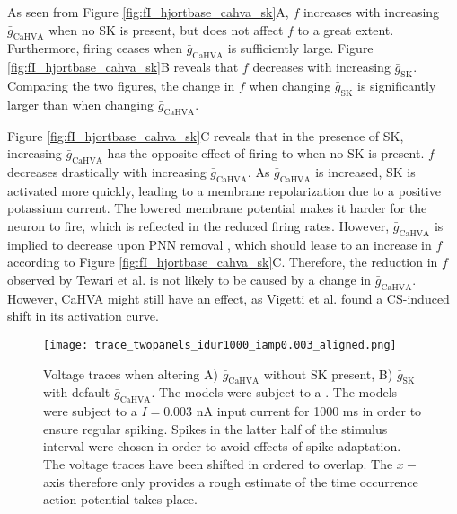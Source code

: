 \documentclass[times, twoside]{zHenriquesLab-StyleBioRxiv}
\begin{document}
As seen from Figure \ref{fig:fI_hjortbase_cahva_sk}A, $f$ increases with increasing $\bar{g}_\text{CaHVA}$ when no SK is present, but does not affect $f$ to a great extent. Furthermore, firing ceases when $\bar{g}_\text{CaHVA}$ is sufficiently large. Figure \ref{fig:fI_hjortbase_cahva_sk}B reveals that $f$ decreases with increasing $\bar{g}_\text{SK}$. Comparing the two figures, the change in $f$ when changing $\bar{g}_\text{SK}$ is significantly larger than when changing $\bar{g}_\text{CaHVA}$. 

Figure \ref{fig:fI_hjortbase_cahva_sk}C reveals that in the presence of SK, increasing $\bar{g}_\text{CaHVA}$ has the opposite effect of firing to when no SK is present. $f$ decreases drastically with increasing $\bar{g}_\text{CaHVA}$. As $\bar{g}_\text{CaHVA}$ is increased, SK is activated more quickly, leading to a membrane repolarization due to a positive potassium current. The lowered membrane potential makes it harder for the neuron to fire, which is reflected in the reduced firing rates. However, $\bar{g}_\text{CaHVA}$ is implied to decrease upon PNN removal \cite{kochlamazashvili_extracellular_2010}, which should lease to an increase in $f$ according to Figure \ref{fig:fI_hjortbase_cahva_sk}C. Therefore, the reduction in $f$ observed by Tewari et al. \cite{tewari_perineuronal_2018} is not likely to be caused by a change in $\bar{g}_\text{CaHVA}$. However, CaHVA might still have an effect, as Vigetti et al. \cite{vigetti_chondroitin_2008} found a CS-induced shift in its activation curve.


\begin{figure*} %
\centering
\texttt{[image: trace\_twopanels\_idur1000\_iamp0.003\_aligned.png]}
\caption{Voltage traces when altering A) $\bar{g}_\text{CaHVA}$ without SK present,  B) $\bar{g}_\text{SK}$ with default $\bar{g}_\text{CaHVA}$. The models were subject to a . The models were subject to a $I=0.003$ nA input current for 1000 ms in order to ensure regular spiking. Spikes in the latter half of the stimulus interval were chosen in order to avoid effects of spike adaptation. The voltage traces have been shifted in ordered to overlap. The $x-$ axis therefore only provides a rough estimate of the time occurrence action potential takes place.}
\label{fig:trace_hjorthbase_cahva_sk}
\end{figure*}
\end{document}
